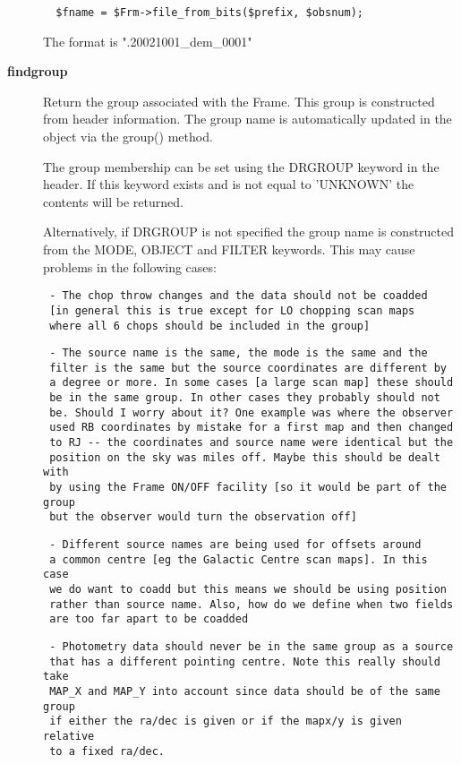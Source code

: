 \begin{description}
\begin{verbatim}
  $fname = $Frm->file_from_bits($prefix, $obsnum);
\end{verbatim}


The format is ".20021001\_dem\_0001"


\item[\textbf{findgroup}] \mbox{}

Return the group associated with the Frame. This group is constructed
from header information. The group name is automatically updated in
the object via the group() method.



The group membership can be set using the DRGROUP keyword in the
header. If this keyword exists and is not equal to 'UNKNOWN' the
contents will be returned.



Alternatively, if DRGROUP is not specified the group name is
constructed from the MODE, OBJECT and FILTER keywords. This may cause
problems in the following cases:

\begin{verbatim}
 - The chop throw changes and the data should not be coadded
 [in general this is true except for LO chopping scan maps
 where all 6 chops should be included in the group]
\end{verbatim}
\begin{verbatim}
 - The source name is the same, the mode is the same and the
 filter is the same but the source coordinates are different by
 a degree or more. In some cases [a large scan map] these should
 be in the same group. In other cases they probably should not
 be. Should I worry about it? One example was where the observer
 used RB coordinates by mistake for a first map and then changed
 to RJ -- the coordinates and source name were identical but the
 position on the sky was miles off. Maybe this should be dealt with
 by using the Frame ON/OFF facility [so it would be part of the group
 but the observer would turn the observation off]
\end{verbatim}
\begin{verbatim}
 - Different source names are being used for offsets around
 a common centre [eg the Galactic Centre scan maps]. In this case
 we do want to coadd but this means we should be using position
 rather than source name. Also, how do we define when two fields
 are too far apart to be coadded
\end{verbatim}
\begin{verbatim}
 - Photometry data should never be in the same group as a source
 that has a different pointing centre. Note this really should take
 MAP_X and MAP_Y into account since data should be of the same group
 if either the ra/dec is given or if the mapx/y is given relative
 to a fixed ra/dec.
\end{verbatim}



\end{description}
